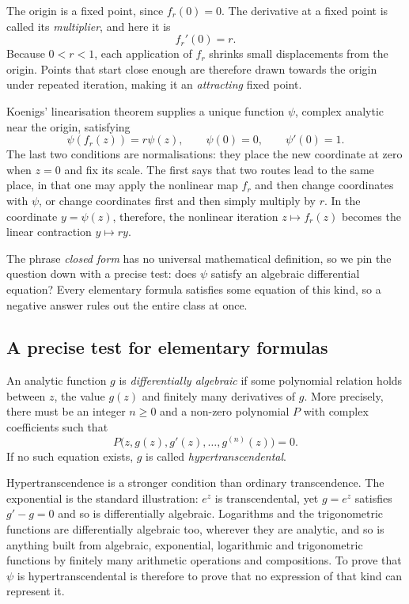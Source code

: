 The origin is a fixed point, since $f_r(0)=0$. The derivative at a fixed point is called its \emph{multiplier}, and here it is
\[
 f_r'(0)=r.
\]
Because $0<r<1$, each application of $f_r$ shrinks small displacements from the origin. Points that start close enough are therefore drawn towards the origin under repeated iteration, making it an \emph{attracting} fixed point.

Koenigs' linearisation theorem \cite{Koenigs1884,Milnor2006} supplies a unique function $\psi$, complex analytic near the origin, satisfying
\begin{equation}\label{eq:koenigs}
 \psi(f_r(z))=r\psi(z),
 \qquad
 \psi(0)=0,
 \qquad
 \psi'(0)=1.
\end{equation}
The last two conditions are normalisations: they place the new coordinate at zero when $z=0$ and fix its scale. The first says that two routes lead to the same place, in that one may apply the nonlinear map $f_r$ and then change coordinates with $\psi$, or change coordinates first and then simply multiply by $r$. In the coordinate $y=\psi(z)$, therefore, the nonlinear iteration $z\mapsto f_r(z)$ becomes the linear contraction $y\mapsto ry$.

The phrase \emph{closed form} has no universal mathematical definition, so we pin the question down with a precise test: does $\psi$ satisfy an algebraic differential equation? Every elementary formula satisfies some equation of this kind, so a negative answer rules out the entire class at once.

\subsection{A precise test for elementary formulas}

\begin{definition}
An analytic function $g$ is \emph{differentially algebraic} if some polynomial relation holds between $z$, the value $g(z)$ and finitely many derivatives of $g$. More precisely, there must be an integer $n\geq 0$ and a non-zero polynomial $P$ with complex coefficients such that
\begin{equation}\label{eq:ade}
 P\bigl(z,g(z),g'(z),\ldots,g^{(n)}(z)\bigr)=0.
\end{equation}
If no such equation exists, $g$ is called \emph{hypertranscendental}.
\end{definition}

Hypertranscendence is a stronger condition than ordinary transcendence. The exponential is the standard illustration: $e^z$ is transcendental, yet $g=e^z$ satisfies $g'-g=0$ and so is differentially algebraic. Logarithms and the trigonometric functions are differentially algebraic too, wherever they are analytic, and so is anything built from algebraic, exponential, logarithmic and trigonometric functions by finitely many arithmetic operations and compositions. To prove that $\psi$ is hypertranscendental is therefore to prove that no expression of that kind can represent it.

